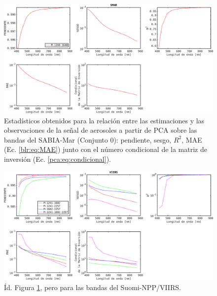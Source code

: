         \begin{figure}
        \centering
        \includegraphics[width=\textwidth]{pca/figures/PCA_Retrievals_SMAR.png}
        \caption[Estadísticos obtenidos para la relación entre las estimaciones y las observaciones de la señal de aerosoles a partir de PCA sobre las bandas del SABIA-Mar.]{Estadísticos obtenidos para la relación entre las estimaciones y las observaciones de la señal de aerosoles a partir de PCA sobre las bandas del SABIA-Mar (Conjunto $0$): pendiente, sesgo, $R^{2}$, MAE (Ec. \ref{blr:eq:MAE}) junto con el número condicional de la matriz de inversión (Ec. \ref{pca:eq:condicional}).}
        \label{pca:PCA_Retrievals_SMAR}
        \end{figure}

        \begin{figure}
        \centering
        \includegraphics[width=\textwidth]{pca/figures/PCA_Retrievals_VIIRS.png}
        \caption[Estadísticos obtenidos para la relación entre las estimaciones y las observaciones de la señal de aerosoles a partir de PCA sobre las bandas del VIIRS.]{Íd. Figura \ref{pca:PCA_Retrievals_SMAR}, pero para las bandas del Suomi-NPP/VIIRS.}
        \label{pca:PCA_Retrievals_VIIRS}
        \end{figure}


